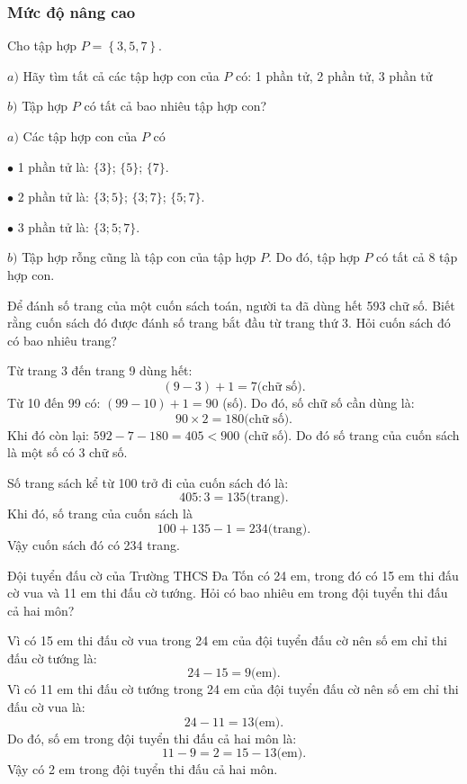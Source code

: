 \subsubsection*{Mức độ nâng cao}
\vspace*{-10pt}
\begin{bt}
	Cho tập hợp $P=\left\{ 3,5,7 \right\}$. 
	
	$a)$ Hãy tìm tất cả các tập hợp con của $P$ có: 1 phần tử, 2 phần tử, 3 phần tử
	
	$b)$ Tập hợp $P$ có tất cả bao nhiêu tập hợp con?
	\begin{loigiaichuong1}
		$a)$	Các tập hợp con của $P$ có
		
		$\bullet$	1 phần tử là: $\{3\}$; $\{5\}$; $\{7\}$.
		
		$\bullet$	2 phần tử là: $\{3; 5\}$; $\{3; 7\}$; $\{5; 7\}$.
		
		$\bullet$	3 phần tử là: $\{3; 5; 7\}$.
		
		$b)$	Tập hợp rỗng cũng là tập con của tập hợp $P$. Do đó, tập hợp $P$ có tất cả 8
		tập hợp con.
	\end{loigiaichuong1}
\end{bt}
\begin{bt}
	Để đánh số trang của một cuốn sách toán, người ta đã dùng hết 593 chữ số. Biết rằng cuốn sách đó được đánh số trang bắt đầu từ trang thứ 3. Hỏi cuốn sách đó có bao nhiêu trang?
	\begin{loigiaichuong1}
		Từ trang 3 đến trang 9 dùng hết:
		\[(9 - 3) + 1 = 7 \text{(chữ số)}.\]
		Từ 10 đến 99 có: $(99 - 10) + 1 = 90$ (số). Do đó, số chữ số cần dùng là:
		\[90 \times 2 = 180 \text{(chữ số)}.\]
		Khi đó còn lại: $592 - 7 - 180 = 405 < 900$ (chữ số). Do đó số trang của cuốn sách là một số có 3 chữ số.
		
		Số trang sách kể từ 100 trở đi của cuốn sách đó là:
		\[405 : 3 = 135 \text{(trang)}.\]
		Khi đó, số trang của cuốn sách là
		\[100 + 135 - 1 = 234 \text{(trang)}.\]
		Vậy cuốn sách đó có 234 trang.
	\end{loigiaichuong1}
\end{bt}
\begin{bt}
	Đội tuyển đấu cờ của Trường THCS Đa Tốn có 24 em, trong đó có 15 em thi đấu cờ vua và 11 em thi đấu cờ tướng. Hỏi có bao nhiêu em trong đội tuyển thi đấu cả hai môn?
	\begin{loigiaichuong1}
		Vì có 15 em thi đấu cờ vua trong 24 em của đội tuyển đấu cờ nên số em chỉ thi đấu cờ tướng là:
		\[24 - 15 = 9 \text{(em)}.\]
		Vì có 11 em thi đấu cờ tướng trong 24 em của đội tuyển đấu cờ nên số em chỉ thi đấu cờ vua là:
		\[24 - 11 = 13 \text{(em)}.\]
		Do đó, số em trong đội tuyển thi đấu cả hai môn là:
		\[11 - 9 = 2 = 15 - 13 \text{(em)}.\]
		Vậy có 2 em trong đội tuyển thi đấu cả hai môn.
	\end{loigiaichuong1}
\end{bt}
